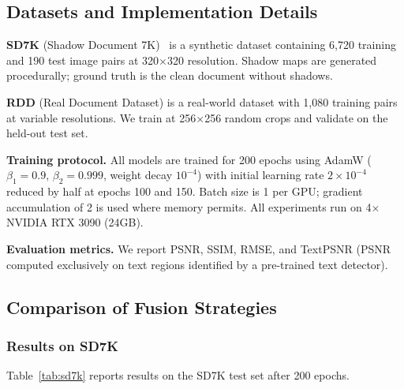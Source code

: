 \documentclass[11pt]{article}
\begin{document}
\subsection{Datasets and Implementation Details}

\textbf{SD7K} (Shadow Document 7K)~\cite{li2023single} is a synthetic dataset containing 6,720 training and 190 test image pairs at 320$\times$320 resolution.
Shadow maps are generated procedurally; ground truth is the clean document without shadows.

\textbf{RDD} (Real Document Dataset) is a real-world dataset with 1,080 training pairs at variable resolutions.
We train at 256$\times$256 random crops and validate on the held-out test set.

\textbf{Training protocol.} All models are trained for 200 epochs using AdamW ($\beta_1=0.9$, $\beta_2=0.999$, weight decay $10^{-4}$) with initial learning rate $2\times10^{-4}$ reduced by half at epochs 100 and 150.
Batch size is 1 per GPU; gradient accumulation of 2 is used where memory permits.
All experiments run on 4$\times$NVIDIA RTX 3090 (24GB).

\textbf{Evaluation metrics.} We report PSNR, SSIM, RMSE, and TextPSNR (PSNR computed exclusively on text regions identified by a pre-trained text detector).

\subsection{Comparison of Fusion Strategies}

\subsubsection{Results on SD7K}

Table~\ref{tab:sd7k} reports results on the SD7K test set after 200 epochs.
\end{document}

